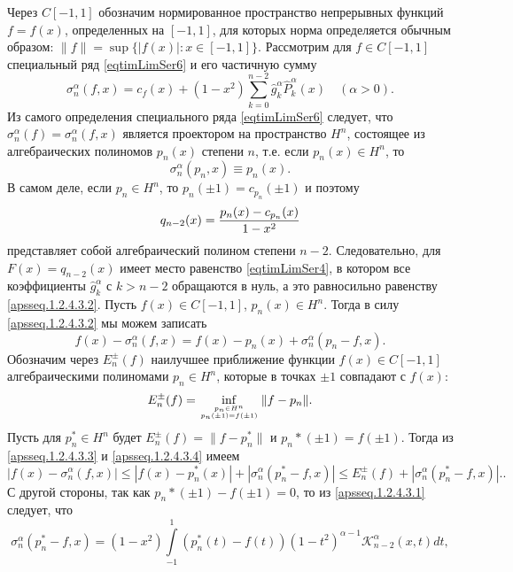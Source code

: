  Через $C[-1,1]$ обозначим нормированное пространство непрерывных
 функций $f=f(x)$, определенных на $[-1,1]$, для которых норма
 определяется обычным образом: $\|f\|=\sup\{|f(x)|:x\in[-1,1]\}$. Рассмотрим
для $f\in C[-1,1]$ специальный ряд \eqref{eqtimLimSer6} и его частичную сумму
 \begin{equation}\label{apsseq.1.2.4.3.1}%
\sigma_n^\alpha(f,x)=c_f(x)+(1-x^2) \sum_{k=0}^{n-2}\hat g_k^\alpha\hat P_k^\alpha(x)\quad(\alpha>0).
\end{equation}
Из самого определения специального ряда \eqref{eqtimLimSer6} следует, что $\sigma_n^\alpha(f)=\sigma_n^\alpha(f,x)$  является проектором на пространство $H^n$, состоящее из алгебраических полиномов $p_n(x)$ степени $n$, т.е. если $p_n(x)\in H^n$, то
\begin{equation}\label{apsseq.1.2.4.3.2}
\sigma_n^\alpha(p_n,x)\equiv p_n(x).
\end{equation}
В самом деле, если $p_n\in H^n$, то $p_n(\pm1)=c_{p_n}(\pm1)$ и поэтому
$$
q_{n-2}(x)={p_n(x)-c_{p_n}(x)\over1-x^2}
$$
представляет собой алгебраический полином степени $n-2$. Следовательно, для $F(x)=q_{n-2}(x)$ имеет место равенство \eqref{eqtimLimSer4}, в котором все коэффициенты $\hat g_k^\alpha$ с $k>n-2$ обращаются в нуль, а это равносильно равенству \eqref{apsseq.1.2.4.3.2}. Пусть $f(x)\in C[-1,1]$, $p_n(x)\in H^n$. Тогда в силу \eqref{apsseq.1.2.4.3.2} мы можем записать
\begin{equation}\label{apsseq.1.2.4.3.3}
f(x)-\sigma_n^\alpha(f,x)= f(x)-p_n(x)+\sigma_n^\alpha(p_n-f,x).
\end{equation}
Обозначим через $E_n^\pm(f)$  наилучшее приближение функции $f(x)\in C[-1,1]$ алгебраическими полиномами $p_n\in H^n$, которые в точках $\pm1$ совпадают с $f(x)$:
\begin{equation}\label{apsseq.1.2.4.3.4}
E_n^\pm(f)=\inf_{p_n\in H^n\atop p_n(\pm1)=f(\pm1)}\|f-p_n\|. \end{equation}
Пусть для $p_n^*\in H^n$ будет $E_n^\pm(f)=\|f-p_n^*\|$ и $ p_n*(\pm1)=f(\pm1)$. Тогда из \eqref{apsseq.1.2.4.3.3} и \eqref{apsseq.1.2.4.3.4} имеем
\begin{equation}\label{apsseq.1.2.4.3.5}
|f(x)-\sigma_n^\alpha(f,x)|\le  |f(x)-p_n^*(x)|+|\sigma_n^\alpha(p_n^*-f,x)|\le E_n^\pm(f)+|\sigma_n^\alpha(p_n^*-f,x)|. .
\end{equation}
С другой стороны, так как $ p_n*(\pm1)-f(\pm1)=0$, то из \eqref{apsseq.1.2.4.3.1} следует, что
\begin{equation}\label{apsseq.1.2.4.3.6}
\sigma_n^\alpha(p_n^*-f,x)=
(1-x^2)\int\limits_{-1}^1(p_n^*(t)-f(t))(1-t^2)^{\alpha-1}\mathcal{K}_{n-2}^\alpha(x,t)dt,
 \end{equation}
